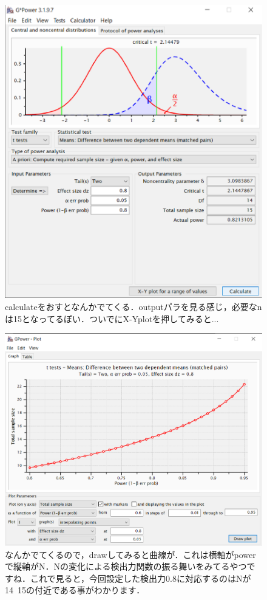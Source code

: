 \documentclass[11pt,a4paper]{ujreport} 	%
\begin{document}
\begin{figure}[H]
  \centering
  \includegraphics[width=12cm]{../figures/gpower4.eps}
  \caption{calculateをおすとなんかでてくる．outputパラを見る感じ，必要なnは15となってるぽい．ついでにX-Yplotを押してみると...}
\end{figure}

\begin{figure}[H]
  \centering
  \includegraphics[width=12cm]{../figures/gpower5.eps}
  \caption{なんかでてくるので，drawしてみると曲線が．これは横軸がpowerで縦軸がN．Nの変化による検出力関数の振る舞いをみてるやつですね．これで見ると，今回設定した検出力0.8に対応するのはNが14~15の付近である事がわかります．}
\end{figure}
\end{document}
